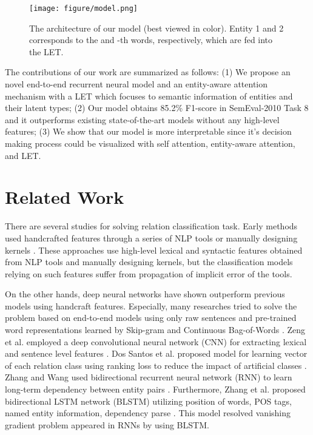 \documentclass[twoside,leqno,twocolumn]{article}
\begin{document}
\begin{figure*}[!ht]
\texttt{[image: figure/model.png]}
\caption{The architecture of our model (best viewed in color). Entity 1 and 2 corresponds to the  and -th words, respectively, which are fed into the LET.}
\label{fig:model}
\end{figure*}

The contributions of our work are summarized as follows:
(1) We propose an novel end-to-end recurrent neural model and an entity-aware attention mechanism with a LET which focuses to semantic information of entities and their latent types;
(2) Our model obtains 85.2\% F1-score in SemEval-2010 Task 8 and it outperforms existing state-of-the-art models without any high-level features;
(3) We show that our model is more interpretable since it's decision making process could be visualized with self attention, entity-aware attention, and LET.



\section{Related Work}
There are several studies for solving relation classification task.
Early methods used handcrafted features through a series of NLP tools or manually designing kernels \cite{rink2010utd}.
These approaches use high-level lexical and syntactic features obtained from NLP tools and manually designing kernels, but the classification models relying on such features suffer from propagation of implicit error of the tools.

On the other hands, deep neural networks have shown outperform previous models using handcraft features. 
Especially, many researches tried to solve the problem based on end-to-end models using only raw sentences and pre-trained word representations learned by Skip-gram and Continuous Bag-of-Words \cite{mikolov2013distributed, mikolov2013efficient, pennington2014glove}.
Zeng et al. employed a deep convolutional neural network (CNN) for extracting lexical and sentence level features \cite{zeng2014relation}.
Dos Santos et al. proposed model for learning vector of each relation class using ranking loss to reduce the impact of artificial classes \cite{dos2015classifying}.
Zhang and Wang used bidirectional recurrent neural network (RNN) to learn long-term dependency between entity pairs \cite{zhang2015relation}.
Furthermore, Zhang et al. proposed bidirectional LSTM network (BLSTM) utilizing position of words, POS tags, named entity information, dependency parse \cite{zhang2015bidirectional}.
This model resolved vanishing gradient problem appeared in RNNs by using BLSTM. 
\end{document}
